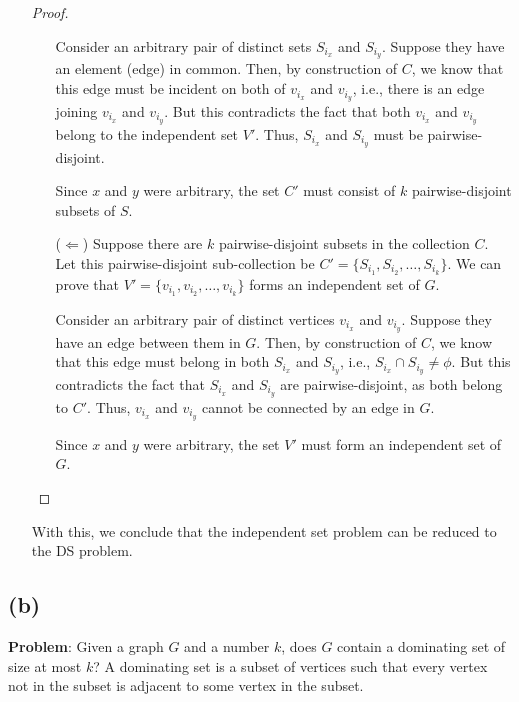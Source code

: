 \documentclass[11pt, fleqn]{article}
\begin{document}
\begin{itemize}
\begin{proof}
\begin{itemize}
            Consider an arbitrary pair of distinct sets $S_{i_x}$ and $S_{i_y}$. Suppose they have an element (edge) in common. Then, by construction of $C$, we know that this edge must be incident on both of $v_{i_x}$ and $v_{i_y}$, i.e., there is an edge joining $v_{i_x}$ and $v_{i_y}$. But this contradicts the fact that both $v_{i_x}$ and $v_{i_y}$ belong to the independent set $V'$. Thus, $S_{i_x}$ and $S_{i_y}$ must be pairwise-disjoint.
            
            Since $x$ and $y$ were arbitrary, the set $C'$ must consist of $k$ pairwise-disjoint subsets of $S$.
            \item[($\Leftarrow$)]
            Suppose there are $k$ pairwise-disjoint subsets in the collection $C$. Let this pairwise-disjoint sub-collection be $C' = \{S_{i_1}, S_{i_2}, \dots, S_{i_k}\}$. We can prove that $V' = \{v_{i_1}, v_{i_2}, \dots, v_{i_k}\}$ forms an independent set of $G$.
            
            Consider an arbitrary pair of distinct vertices $v_{i_x}$ and $v_{i_y}$. Suppose they have an edge between them in $G$. Then, by construction of $C$, we know that this edge must belong in both $S_{i_x}$ and $S_{i_y}$, i.e., $S_{i_x} \cap S_{i_y} \neq \phi$. But this contradicts the fact that $S_{i_x}$ and $S_{i_y}$ are pairwise-disjoint, as both belong to $C'$. Thus, $v_{i_x}$ and $v_{i_y}$ cannot be connected by an edge in $G$.
            
            Since $x$ and $y$ were arbitrary, the set $V'$ must form an independent set of $G$.
        \end{itemize}
    \end{proof}
    With this, we conclude that the independent set problem can be reduced to the DS problem.
\end{itemize}

\newpage

\subsection*{(b)}

\textbf{Problem}: Given a graph $G$ and a number $k$, does $G$ contain a dominating set of size at most $k$? A dominating set is a subset of vertices such that every vertex not in the subset is adjacent to some vertex in the subset.

\bigskip
\end{document}
